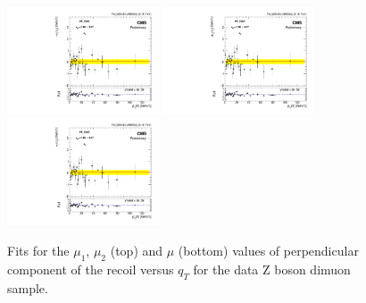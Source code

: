 \begin{figure}
\begin{center}
\includegraphics[width=0.4\textwidth]{Figures/WBoson/Analysis/Correction/Recoil/RecoilFitsqT/Data/fitPFu2mean1.pdf}
\includegraphics[width=0.4\textwidth]{Figures/WBoson/Analysis/Correction/Recoil/RecoilFitsqT/Data/fitPFu2mean2.pdf} \\
\includegraphics[width=0.4\textwidth]{Figures/WBoson/Analysis/Correction/Recoil/RecoilFitsqT/Data/fitPFu2mean.pdf}
\caption{Fits for the $\mu_{1}$,  $\mu_{2}$ (top) and $\mu$ (bottom) values of perpendicular component of the recoil versus $q_{T}$ for the data Z boson dimuon sample.}
\label{fig:figU2RecoilScaleFit_data}
\end{center}
\end{figure}

